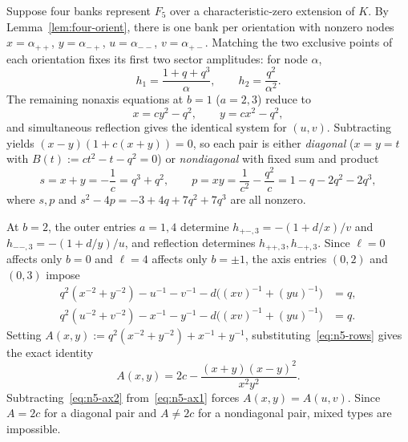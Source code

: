 \documentclass[11pt,reqno]{amsart}
\numberwithin{equation}{section}
\theoremstyle{definition}
\theoremstyle{remark}
\begin{document}
Suppose four banks represent $F_5$ over a characteristic-zero extension of $K$. By Lemma~\ref{lem:four-orient}, there is one bank per orientation with nonzero nodes $x=\alpha_{++}$, $y=\alpha_{-+}$, $u=\alpha_{--}$, $v=\alpha_{+-}$. Matching the two exclusive points of each orientation fixes its first two sector amplitudes: for node $\alpha$,
\[
h_1 = \frac{1+q+q^3}{\alpha},\qquad h_2 = \frac{q^2}{\alpha^2}.
\]
The remaining nonaxis equations at $b=1$ ($a=2,3$) reduce to
\begin{equation}
\label{eq:n5-rows}
x = cy^2 - q^2,\qquad y = cx^2 - q^2,
\end{equation}
and simultaneous reflection gives the identical system for $(u,v)$. Subtracting yields $(x-y)(1+c(x+y))=0$, so each pair is either \emph{diagonal} ($x=y=t$ with $B(t):=ct^2-t-q^2=0$) or \emph{nondiagonal} with fixed sum and product
\begin{equation}
\label{eq:n5-sp}
s = x+y = -\frac{1}{c} = q^3+q^2,\qquad p = xy = \frac{1}{c^2}-\frac{q^2}{c} = 1-q-2q^2-2q^3,
\end{equation}
where $s,p$ and $s^2-4p=-3+4q+7q^2+7q^3$ are all nonzero.

At $b=2$, the outer entries $a=1,4$ determine $h_{+-,3}=-(1+d/x)/v$ and $h_{--,3}=-(1+d/y)/u$, and reflection determines $h_{++,3}, h_{-+,3}$. Since $\ell=0$ affects only $b=0$ and $\ell=4$ affects only $b=\pm 1$, the axis entries $(0,2)$ and $(0,3)$ impose
\begin{align}
q^2(x^{-2}+y^{-2}) - u^{-1} - v^{-1} - d\bigl((xv)^{-1}+(yu)^{-1}\bigr) &= q, \label{eq:n5-ax1}\\
q^2(u^{-2}+v^{-2}) - x^{-1} - y^{-1} - d\bigl((xv)^{-1}+(yu)^{-1}\bigr) &= q. \label{eq:n5-ax2}
\end{align}
Setting $A(x,y):=q^2(x^{-2}+y^{-2})+x^{-1}+y^{-1}$, substituting~\eqref{eq:n5-rows} gives the exact identity
\[
A(x,y) = 2c - \frac{(x+y)(x-y)^2}{x^2 y^2}.
\]
Subtracting~\eqref{eq:n5-ax2} from~\eqref{eq:n5-ax1} forces $A(x,y)=A(u,v)$. Since $A=2c$ for a diagonal pair and $A\ne 2c$ for a nondiagonal pair, mixed types are impossible.
\end{document}
